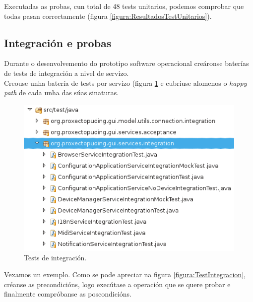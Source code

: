   Executadas as probas, cun total de 48 tests unitarios, podemos comprobar que
  todas pasan correctamente (figura \ref{figura:ResultadosTestUnitarios}).

 \subsection{Integración e probas}
 
 Durante o desenvolvemento do prototipo software operacional creáronse baterías
 de tests de integración a nivel de servizo. \\
 
 Creouse unha batería de tests por servizo (figura \ref{figura:TestsIntegracion}
 e cubriuse alomenos o \textit{happy path} de cada unha das súas sinaturas. \\
  
  \begin{figure}[htbp]
   \centering
   \includegraphics[scale=0.8,keepaspectratio=true]{./imagenes/tests-integracion.png}
   \caption{Tests de integración.}
   \label{figura:TestsIntegracion}
  \end{figure}
  
  Vexamos un exemplo. Como se pode apreciar na figura \ref{figura:TestIntegracion},
  créanse as precondicións, logo execútase a operación que se quere probar e
  finalmente compróbanse as poscondicións. \\
  
